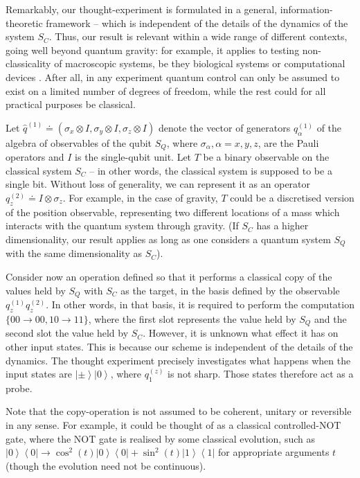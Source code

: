 \documentclass[prl,twocolumn,showpacs,preprintnumbers,amsmath,amssymb]{revtex4}
\newcommand{\ket}[1]{\left | #1 \right\rangle}
\newcommand{\bra}[1]{\left \langle #1 \right |}
\begin{document}
Remarkably, our thought-experiment is formulated in a general, information-theoretic framework -- which is independent of the details of the dynamics of the system $S_C$. Thus, our result is relevant within a wide range of different contexts, going well beyond quantum gravity: for example, it applies to testing non-classicality of macroscopic systems, be they biological systems \cite{DAV, DAVE} or computational devices \cite{TRO}. After all, in any experiment quantum control can only be assumed to exist on a limited number of degrees of freedom, while the rest could for all practical purposes be classical. 

\bigskip

Let $\hat q^{(1)}\doteq(\sigma_x\otimes I, \sigma_y\otimes I, \sigma_z\otimes I)$ denote the vector of generators $q_{\alpha}^{(1)}$ of the algebra of observables of the qubit $S_Q$, where $\sigma_{\alpha}, \alpha =x,y,z$, are the Pauli operators and $I$ is the single-qubit unit. Let $T$ be a binary observable on the classical system $S_C$ -- in other words, the classical system is supposed to be a single bit. Without loss of generality, we can represent it as an operator $q_z^{(2)}\doteq I\otimes\sigma_z$. For example, in the case of gravity, $T$ could be a discretised version of the position observable, representing two different locations of a mass which interacts with the quantum system through gravity. (If $S_C$ has a higher dimensionality, our result applies as long as one considers a quantum system $S_Q$ with the same dimensionality as $S_C$). 

Consider now an operation defined so that it performs a classical copy of the values held by $S_Q$ with $S_C$ as the target, in the basis defined by the observable $q_z^{(1)}q_z^{(2)}$. In other words, in that basis, it is required to perform the computation $\{00\rightarrow 00, 10\rightarrow 11\}$, where the first slot represents the value held by $S_Q$ and the second slot the value held by $S_C$. However, it is unknown what effect it has on other input states.  This is because our scheme is independent of the details of the dynamics. The thought experiment precisely investigates what happens when the input states are $\ket{\pm}\ket{0}$, where $q_1^{(z)}$ is not sharp. Those states therefore act as a probe. 

Note that the copy-operation is not assumed to be coherent, unitary or reversible in any sense. For example, it could be thought of as a classical controlled-NOT gate, where the NOT gate is realised by some classical evolution, such as $\ket{0}\bra{0}\rightarrow \cos^2( t)\ket{0}\bra{0}+\sin^2(t)\ket{1}\bra{1}$ for appropriate arguments $t$ (though the evolution need not be continuous).
\end{document}
